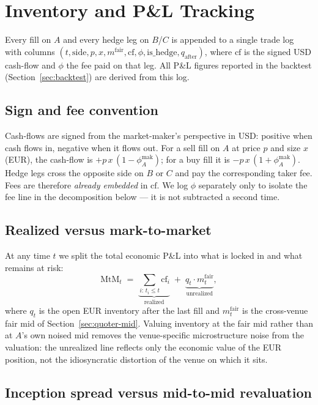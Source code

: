 \section{Inventory and P\&L Tracking}
\label{sec:pnl}

Every fill on $A$ and every hedge leg on $B$/$C$ is appended to a
single trade log with columns $(t, \mathrm{side}, p, x, m^{\text{fair}}, \mathrm{cf}, \phi, \mathrm{is\_hedge}, q_{\text{after}})$,
where $\mathrm{cf}$ is the signed USD cash-flow and $\phi$ the fee
paid on that leg. All P\&L figures reported in the backtest
(Section~\ref{sec:backtest}) are derived from this log.
\subsection{Sign and fee convention}

Cash-flows are signed from the market-maker's perspective in USD:
positive when cash flows in, negative when it flows out. For a sell
fill on $A$ at price $p$ and size $x$ (EUR), the cash-flow is
$+p\,x\,(1 - \phi_A^{\text{mak}})$; for a buy fill it is
$-p\,x\,(1 + \phi_A^{\text{mak}})$. Hedge legs cross the opposite
side on $B$ or $C$ and pay the corresponding taker fee. Fees are
therefore \emph{already embedded} in $\mathrm{cf}$. We log $\phi$
separately only to isolate the fee line in the decomposition below
--- it is not subtracted a second time.

\subsection{Realized versus mark-to-market}

At any time $t$ we split the total economic P\&L into what is
locked in and what remains at risk:
\begin{equation}
  \mathrm{MtM}_t \;=\; \underbrace{\sum_{i:\,t_i \le t} \mathrm{cf}_i}_{\text{realized}}
                 \;+\; \underbrace{q_t \cdot m^{\text{fair}}_t}_{\text{unrealized}},
  \label{eq:mtm-split}
\end{equation}
where $q_t$ is the open EUR inventory after the last fill and
$m^{\text{fair}}_t$ is the cross-venue fair mid of
Section~\ref{sec:quoter-mid}. Valuing inventory at the fair mid
rather than at $A$'s own noised mid removes the venue-specific
microstructure noise from the valuation: the unrealized line reflects
only the economic value of the EUR position, not the idiosyncratic
distortion of the venue on which it sits.

\subsection{Inception spread versus mid-to-mid revaluation}

